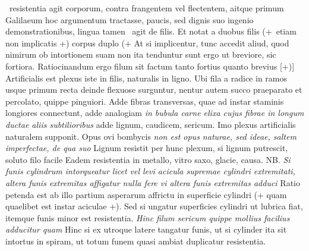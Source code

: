 \pend 
\count{}
\count{}
\pstart
{} \, resistentia agit corporum, contra frangentem vel flectentem, aitque primum Galilaeum\protect{}
hoc argumentum tractasse, paucis, sed dignis suo ingenio demonstrationibus, lingua\protect{} tamen  \hspace{-1.2mm}
 \, agit de filis. Et notat a duobus filis (+~etiam non implicatis +) corpus duplo  (+ At si implicentur, tunc accedit aliud, quod nimirum ob intortionem suam non ita tenduntur sunt ergo ut breviore, sic fortiora. Ratiocinandum ergo filum sit factum tanto fortius quanto brevius [+)] Artificialis est plexus iste in filis, naturalis in ligno. Ubi fila a radice\protect{} in ramos\protect{} usque primum recta deinde flexuose surguntur, nentur autem succo praeparato et percolato, quippe pinguiori. Adde fibras transversas, quae ad instar staminis longiores connectunt, adde analogiam \textit{in bubula carne elixa cujus fibrae in longum ductae aliis subtilioribus } adde lignum, caudicem, sericum. Imo plexus artificialis naturalem supponit. Opus ovi bombycis\protect{} \textit{non est opus naturae, sed ideae, saltem imperfectae, de qua suo } Lignum resistit per hunc plexum,  si lignum putrescit, soluto filo facile  Eadem resistentia in metallo, vitro saxo, glacie, causa. NB. \textit{Si funis\protect{} cylindrum intorqueatur licet vel levi acicula supremae cylindri extremitati, altera funis extremitas affigatur nulla fere vi altera funis extremitas adduci } Ratio petenda est ab illo partium asperarum affrictu in superficie cylindri (+ quam quaelibet est instar aciculae +). Sed si ungatur superficies cylindri ut lubrica fiat, itemque funis minor est resistentia. \textit{Hinc filum sericum quippe mollius facilius adducitur quam } Hinc si ex utroque latere tangatur funis, ut si cylinder ita sit intortus in spiram, ut totum funem quasi ambiat duplicatur resistentia.
